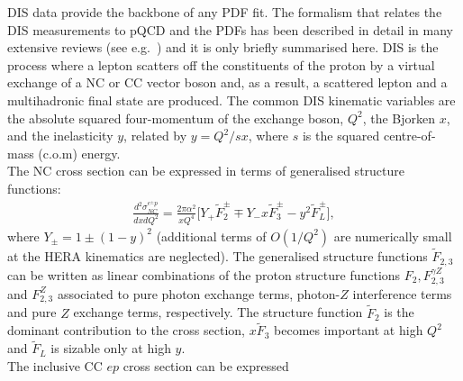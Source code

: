DIS data provide the backbone of any PDF fit.
The for\-ma\-lism that relates the DIS measurements to pQCD and the PDFs has been described
in detail in many extensive reviews (see e.g.~\cite{disbook}) and it is only briefly summarised here.
DIS is the process where a lepton scatters off the constituents of the proton
by a virtual exchange of a NC 
or CC vector boson and, as a result, a scattered lepton and a 
multihadronic final state are produced.
The common DIS kinematic variables are the absolute squared four-momentum of 
the exchange boson, $Q^2$, the Bjorken $x$, 
and the inelasticity $y$, related by $y=Q^2/sx$, where $s$ is the squared centre-of-mass (c.o.m) energy.
\\
%
The NC cross section can be expressed in terms of generalised structure functions:
\begin{eqnarray}
   \frac{d^2\sigma_{NC}^{e^{\pm} p}}{dxdQ^2}=\frac{2\pi\alpha^2}{xQ^4} 
     \big [ Y_{+} \tilde F_2^{\pm} \mp Y_{-}x \tilde F_3^{\pm} - y^2 \tilde F_L^{\pm} \big ],
\end{eqnarray}
where $Y_{\pm} = 1 \pm (1-y)^2$ (additional terms of $O(1/Q^2)$ are numerically small 
at the HERA kinematics are neglected). 
The generalised structure functions $\tilde F_{2,3}$ 
can be written as linear combinations of the proton structure functions $F_2, F_{2,3}^{\gamma Z}$ 
and $F_{2,3}^Z$ associated to pure photon exchange terms, photon-$Z$ interference
terms and pure $Z$ exchange terms, respectively. 
The structure function $\tilde F_2$ is the dominant contribution to the cross section, 
$x \tilde F_3$ becomes important at high $Q^2$ and $\tilde F_L$ is sizable 
only at high $y$. 
\\
The inclusive CC $ep$ cross section can be expressed 
